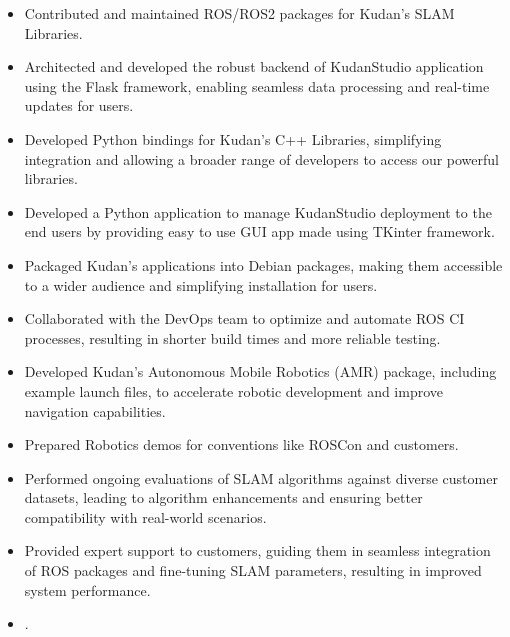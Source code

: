 \documentclass[10pt,a4paper,ragged2e]{altacv}
\begin{document}
\begin{itemize}
\item Contributed and maintained ROS/ROS2 packages for Kudan's SLAM Libraries.
\item Architected and developed the robust backend of KudanStudio application using the Flask framework, enabling seamless data processing and real-time updates for users.
\item Developed Python bindings for Kudan's C++ Libraries, simplifying integration and allowing a broader range of developers to access our powerful libraries.
\item Developed a Python application to manage KudanStudio deployment to the end users by providing easy to use GUI app made using TKinter framework.
\item Packaged Kudan's applications into Debian packages, making them accessible to a wider audience and simplifying installation for users.
\item Collaborated with the DevOps team to optimize and automate ROS CI processes, resulting in shorter build times and more reliable testing.
\item Developed Kudan's Autonomous Mobile Robotics (AMR) package, including example launch files, to accelerate robotic development and improve navigation capabilities.
\item Prepared Robotics demos for conventions like ROSCon and customers. 
\item Performed ongoing evaluations of SLAM algorithms against diverse customer datasets, leading to algorithm enhancements and ensuring better compatibility with real-world scenarios.
\item Provided expert support to customers, guiding them in seamless integration of ROS packages and fine-tuning SLAM parameters, resulting in improved system performance.
\item {}.
\end{itemize}

\divider
\end{document}
